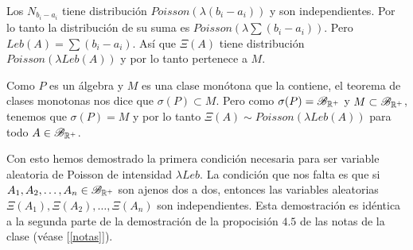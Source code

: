 Los $N_{b_i - a_i}$ tiene distribución $Poisson(\lambda (b_i - a_i))$ y son independientes. Por lo tanto
la distribución de su suma es $Poisson\left(\lambda \sum (b_i - a_i) \right)$. Pero $Leb(A) = \sum (b_i - a_i)$. Así que
$\Xi(A)$ tiene distribución $Poisson(\lambda Leb(A))$ y por lo tanto pertenece a $M$.\pn

Como $P$ es un álgebra y $M$ es una clase monótona que la contiene, el teorema de clases monotonas nos dice que
$\sigma(P) \subset M$. Pero como $\sigma(P) = \mathscr{B}_{\mathbb{R}^+}$ y $M \subset \mathscr{B}_{\mathbb{R}^+}$, tenemos que $\sigma(P) = M$ y por lo tanto
$\Xi(A) \sim Poisson(\lambda Leb(A))$ para todo $A \in \mathscr{B}_{\mathbb{R}^+}$.\pn

Con esto hemos demostrado la primera condición necesaria para ser variable aleatoria de Poisson de intensidad $\lambda Leb$. La
condición que nos falta es que si $A_1, A_2, \dots, A_n \in \mathscr{B}_{\mathbb{R}^+}$ son ajenos dos a dos, entonces las variables aleatorias 
$\Xi(A_1), \Xi(A_2), \dots, \Xi(A_n)$ son independientes. Esta demostración es idéntica a la segunda parte de la demostración de la
propocisión $4.5$ de las notas de la clase (véase [\ref{notas}]).\pn